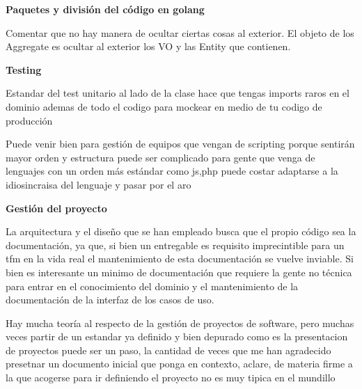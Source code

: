 \textbf{Paquetes y división del código en golang}

Comentar que no hay manera de ocultar ciertas cosas al exterior. El objeto de los Aggregate es ocultar al exterior los VO y las Entity que contienen.

\textbf{Testing}

Estandar del test unitario al lado de la clase hace que tengas imports raros en el dominio ademas de todo el codigo para mockear en medio de tu codigo de producción

Puede venir bien para gestión de equipos que vengan de scripting porque sentirán mayor orden y estructura
puede ser complicado para gente que venga de lenguajes con un orden más estándar como js,php puede costar adaptarse a la idiosincraisa del lenguaje y pasar por el aro

\textbf{Gestión del proyecto}

La arquitectura y el diseño que se han empleado busca que el propio código sea la documentación, ya que, si bien un entregable es requisito imprecintible para un tfm en la vida real el mantenimiento de esta documentación se vuelve inviable. Si bien es interesante un minimo de documentación que requiere la gente no técnica para entrar en el conocimiento del dominio y el mantenimiento de la documentación de la interfaz de los casos de uso.

Hay mucha teoría al respecto de la gestión de proyectos de software, pero muchas veces partir de un estandar ya definido y bien depurado como es la presentacion de proyectos puede ser un paso, la cantidad de veces que me han agradecido presetnar un documento inicial que ponga en contexto, aclare, de materia firme a la que acogerse para ir definiendo el proyecto no es muy tipica en el mundillo
